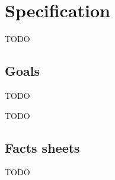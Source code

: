 \chapter{Specification} %
\label{cha:Specification}

TODO


\section{Goals} %
\label{sec:Goals}

TODO





    
    


TODO




\section{Facts sheets} %
\label{sec:Facts sheets}

TODO






